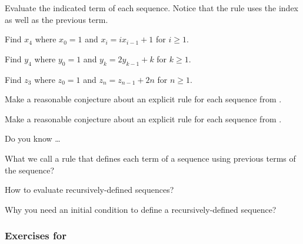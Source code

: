 \begin{exer}[\exerP] %
\label{exam_rec_def_seq_find_term_uses_index}
    Evaluate the indicated term of each sequence.  Notice that the rule uses the index as well as the previous term. 
        \begin{exerpart}
            \item Find $x_4$ where $x_0= 1$ and $x_i = ix_{i-1}+1$ for $i \ge 1$.
            \item Find $y_4$ where $y_0= 1$ and $y_k = 2y_{k-1}+k$ for $k \ge 1$.
            \item Find $z_3$ where $z_0= 1$ and $z_n = z_{n-1}+2n$ for $n \ge 1$.
        \end{exerpart}
\end{exer}

\begin{exer}[\exerU] %
\label{exer_rec_def_seq_conj_explicit}
    Make a reasonable conjecture about an explicit rule for each sequence from . 
\end{exer}

\begin{exer}[\exerU] %
\label{exer_rec_def_seq_conj_explicit_again}
    Make a reasonable conjecture about an explicit rule for each sequence from . 
\end{exer}

\begin{exer}[\exerR] %
\label{exer_dyk_rec_def_seq}
    Do you know \ldots
        \begin{exerpart}
            \item What we call a rule that defines each term of a sequence using previous terms of the sequence?
            \item How to evaluate recursively-defined sequences?
            \item Why you need an initial condition to define a recursively-defined sequence?
        \end{exerpart}
\end{exer}


\subsubsection*{Exercises for   \subntr}
 
